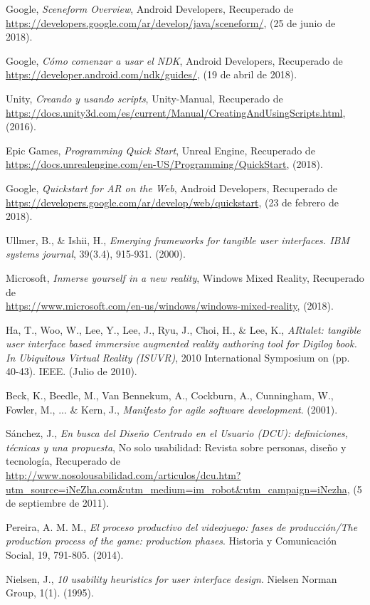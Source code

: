 Google, {\em Sceneform Overview}, Android Developers, Recuperado de \\
\url{https://developers.google.com/ar/develop/java/sceneform/}, (25 de junio de 2018).

Google, {\em Cómo comenzar a usar el NDK}, Android Developers, Recuperado de \\
\url{https://developer.android.com/ndk/guides/}, (19 de abril de 2018).

Unity, {\em Creando y usando scripts}, Unity-Manual, Recuperado de \\
\url{https://docs.unity3d.com/es/current/Manual/CreatingAndUsingScripts.html}, (2016).

Epic Games, {\em Programming Quick Start}, Unreal Engine, Recuperado de \\
\url{https://docs.unrealengine.com/en-US/Programming/QuickStart}, (2018).

Google, {\em Quickstart for AR on the Web}, Android Developers, Recuperado de \\
\url{https://developers.google.com/ar/develop/web/quickstart}, (23 de febrero de 2018).

Ullmer, B., & Ishii, H., {\em Emerging frameworks for tangible user interfaces. IBM systems journal}, 39(3.4), 915-931. (2000).

Microsoft, {\em Inmerse yourself in a new reality}, Windows Mixed Reality, Recuperado de \\
\url{https://www.microsoft.com/en-us/windows/windows-mixed-reality}, (2018).

Ha, T., Woo, W., Lee, Y., Lee, J., Ryu, J., Choi, H., & Lee, K., {\em ARtalet: tangible user interface based immersive augmented reality authoring tool for Digilog book. In Ubiquitous Virtual Reality (ISUVR)}, 2010 International Symposium on (pp. 40-43). IEEE. (Julio de 2010).

Beck, K., Beedle, M., Van Bennekum, A., Cockburn, A., Cunningham, W., Fowler, M., ... & Kern, J., {\em Manifesto for agile software development}. (2001).

Sánchez, J., {\em En busca del Diseño Centrado en el Usuario (DCU): definiciones, técnicas y una propuesta}, No solo usabilidad: Revista sobre personas, diseño y tecnología, Recuperado de \\
\url{http://www.nosolousabilidad.com/articulos/dcu.htm?utm_source=iNeZha.com&utm_medium=im_robot&utm_campaign=iNezha}, (5 de septiembre de 2011).

Pereira, A. M. M., {\em El proceso productivo del videojuego: fases de producción/The production process of the game: production phases}. Historia y Comunicación Social, 19, 791-805. (2014).

Nielsen, J., {\em 10 usability heuristics for user interface design}. Nielsen Norman Group, 1(1). (1995).
